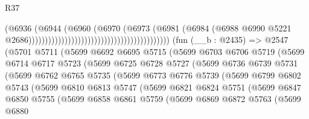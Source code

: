 \begin{lexlean}{R37}
\begin{coremodule}
                                                                          (@6936
                                                                            (@6944
                                                                              (@6960
                                                                                (@6970
                                                                                  (@6973
                                                                                    (@6981
                                                                                      (@6984
                                                                                        (@6988
                                                                                          @6990
                                                                                          @5221
                                                                                          @2686)))))))))))))))))))))))))))))))))))))))))))
    (fun (__b : @2435) =>
    @2547
      (@5701
        @5711
        (@5699
          @6692
          @6695
          @5715
          (@5699
            @6703
            @6706
            @5719
            (@5699
              @6714
              @6717
              @5723
              (@5699
                @6725
                @6728
                @5727
                (@5699
                  @6736
                  @6739
                  @5731
                  (@5699
                    @6762
                    @6765
                    @5735
                    (@5699
                      @6773
                      @6776
                      @5739
                      (@5699
                        @6799
                        @6802
                        @5743
                        (@5699
                          @6810
                          @6813
                          @5747
                          (@5699
                            @6821
                            @6824
                            @5751
                            (@5699
                              @6847
                              @6850
                              @5755
                              (@5699
                                @6858
                                @6861
                                @5759
                                (@5699
                                  @6869
                                  @6872
                                  @5763
                                  (@5699
                                    @6880

\end{coremodule}
\end{lexlean}
